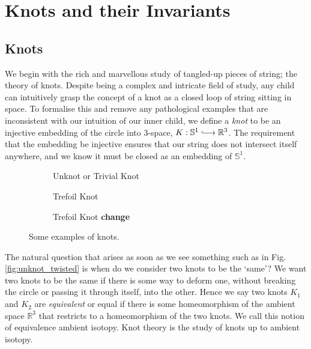 \documentclass[12pt]{report}
\newcommand{\R}{\mathbb{R}}
\renewcommand{\S}{\mathbb{S}}
\newcommand{\notered}[1]{{\color{Red} \textbf{#1}}}
\begin{document}
\chapter{Knots and their Invariants}

\section{Knots}

We begin with the rich and marvellous study of tangled-up pieces of string; the theory of knots. Despite being a complex and intricate field of study, any child can intuitively grasp the concept of a knot as a closed loop of string sitting in space. To formalise this and remove any pathological examples that are inconsistent with our intuition of our inner child, we define a \textit{knot} to be an injective embedding of the circle into $3$-space, $K: \S^{1} \lhook\joinrel\longrightarrow \R^{3}$. The requirement that the embedding be injective ensures that our string does not intersect itself anywhere, and we know it must be closed as an embedding of $\S^{1}$.

\begin{figure}[hbt]
	\centering
	\hfill
	\begin{subfigure}[b]{0.3 \textwidth}
		\centering
		\def\svgscale{0.2}
		
		\caption{Unknot or Trivial Knot}
	\end{subfigure}
	\hfill
	\begin{subfigure}[b]{0.3 \textwidth}
		\centering
		\def\svgscale{0.2}
		
		\caption{Trefoil Knot}
	\end{subfigure}
	\hfill
	\begin{subfigure}[b]{0.3 \textwidth}
		\centering
		\def\svgscale{0.2}
		
		\caption{Trefoil Knot \notered{change}}
	\end{subfigure}
	\caption{Some examples of knots.}
	\hfill \phantom{1}
\end{figure}

The natural question that arises as soon as we see something such as in Fig. \ref{fig:unknot_twisted} is when do we consider two knots to be the `same'? We want two knots to be the same if there is some way to deform one, without breaking the circle or passing it through itself, into the other. Hence we say two knots $K_{1}$ and $K_{2}$ are \textit{equivalent} or equal if there is some homeomorphism of the ambient space $\R^{3}$ that restricts to a homeomorphism of the two knots. We call this notion of equivalence ambient isotopy. Knot theory is the study of knots up to ambient isotopy.
\end{document}
